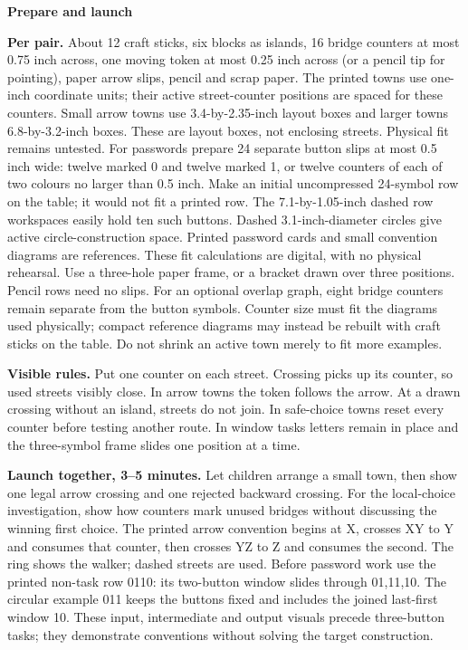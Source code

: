 \documentclass[11pt]{article}
\newcommand{\parttitle}[1]{{\large\bfseries\color{ink}#1}\par}
\newcommand{\labelled}[2]{\textbf{#1} #2\par}
\begin{document}
\newpage
\parttitle{Prepare and launch}
\labelled{Per pair.}{About 12 craft sticks, six blocks as islands, 16 bridge counters at most 0.75 inch across, one moving token at most 0.25 inch across (or a pencil tip for pointing), paper arrow slips, pencil and scrap paper. The printed towns use one-inch coordinate units; their active street-counter positions are spaced for these counters. Small arrow towns use 3.4-by-2.35-inch layout boxes and larger towns 6.8-by-3.2-inch boxes. These are layout boxes, not enclosing streets. Physical fit remains untested. For passwords prepare 24 separate button slips at most 0.5 inch wide: twelve marked 0 and twelve marked 1, or twelve counters of each of two colours no larger than 0.5 inch. Make an initial uncompressed 24-symbol row on the table; it would not fit a printed row. The 7.1-by-1.05-inch dashed row workspaces easily hold ten such buttons. Dashed 3.1-inch-diameter circles give active circle-construction space. Printed password cards and small convention diagrams are references. These fit calculations are digital, with no physical rehearsal. Use a three-hole paper frame, or a bracket drawn over three positions. Pencil rows need no slips. For an optional overlap graph, eight bridge counters remain separate from the button symbols. Counter size must fit the diagrams used physically; compact reference diagrams may instead be rebuilt with craft sticks on the table. Do not shrink an active town merely to fit more examples.}
\labelled{Visible rules.}{Put one counter on each street. Crossing picks up its counter, so used streets visibly close. In arrow towns the token follows the arrow. At a drawn crossing without an island, streets do not join. In safe-choice towns reset every counter before testing another route. In window tasks letters remain in place and the three-symbol frame slides one position at a time.}
\labelled{Launch together, 3--5 minutes.}{Let children arrange a small town, then show one legal arrow crossing and one rejected backward crossing. For the local-choice investigation, show how counters mark unused bridges without discussing the winning first choice. The printed arrow convention begins at X, crosses XY to Y and consumes that counter, then crosses YZ to Z and consumes the second. The ring shows the walker; dashed streets are used. Before password work use the printed non-task row 0110: its two-button window slides through 01,11,10. The circular example 011 keeps the buttons fixed and includes the joined last-first window 10. These input, intermediate and output visuals precede three-button tasks; they demonstrate conventions without solving the target construction.}
\end{document}
